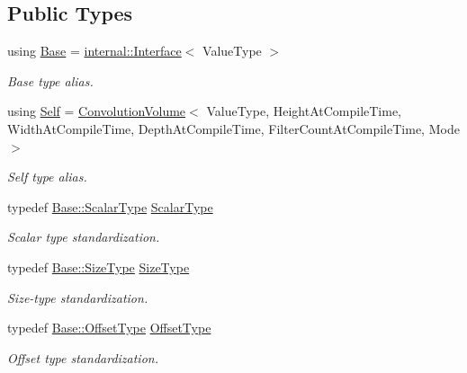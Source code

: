 \subsection*{Public Types}
\begin{DoxyCompactItemize}
\item 
using \hyperlink{classffnn_1_1layer_1_1_convolution_volume_aca83c6f7b34f8865682859f2e096858d}{Base} = \hyperlink{classffnn_1_1layer_1_1internal_1_1_interface}{internal\-::\-Interface}$<$ Value\-Type $>$
\begin{DoxyCompactList}\small\item\em Base type alias. \end{DoxyCompactList}\item 
using \hyperlink{classffnn_1_1layer_1_1_convolution_volume_a176ff3362c3ce073b92f837b65cde684}{Self} = \hyperlink{classffnn_1_1layer_1_1_convolution_volume}{Convolution\-Volume}$<$ Value\-Type, Height\-At\-Compile\-Time, Width\-At\-Compile\-Time, Depth\-At\-Compile\-Time, Filter\-Count\-At\-Compile\-Time, Mode $>$
\begin{DoxyCompactList}\small\item\em Self type alias. \end{DoxyCompactList}\item 
typedef \hyperlink{classffnn_1_1layer_1_1internal_1_1_interface_a7f834e3365e5199bcbcd16d9abd63941}{Base\-::\-Scalar\-Type} \hyperlink{classffnn_1_1layer_1_1_convolution_volume_aee5896ca6c930a673234c66446753432}{Scalar\-Type}
\begin{DoxyCompactList}\small\item\em Scalar type standardization. \end{DoxyCompactList}\item 
typedef \hyperlink{classffnn_1_1layer_1_1internal_1_1_interface_af0567642f60c65b5e87067226a54174b}{Base\-::\-Size\-Type} \hyperlink{classffnn_1_1layer_1_1_convolution_volume_abddc276f0405f5c0d70de3e43c2824d9}{Size\-Type}
\begin{DoxyCompactList}\small\item\em Size-\/type standardization. \end{DoxyCompactList}\item 
typedef \hyperlink{classffnn_1_1layer_1_1internal_1_1_interface_adc5bb454329ebd51ac26579a43c006fd}{Base\-::\-Offset\-Type} \hyperlink{classffnn_1_1layer_1_1_convolution_volume_a17bdd4d0402730cbc4cd491cb8c3bdfd}{Offset\-Type}
\begin{DoxyCompactList}\small\item\em Offset type standardization. \end{DoxyCompactList}\item 

\end{DoxyCompactItemize}
